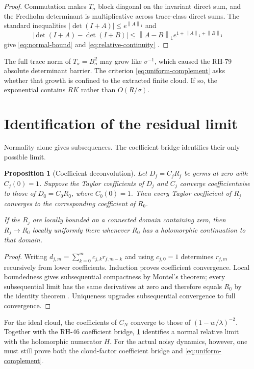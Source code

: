 \documentclass[11pt]{article}
\newtheorem{proposition}[theorem]{Proposition}
\theoremstyle{remark}
\newcommand{\norm}[1]{\left\lVert#1\right\rVert}
\begin{document}
\begin{proof}
Commutation makes $T_\sigma$ block diagonal on the invariant direct sum, and
the Fredholm determinant is multiplicative across trace-class direct sums.
The standard inequalities
$|\det(I+A)|\le e^{\norm A_1}$ and
\[
 |\det(I+A)-\det(I+B)|
 \le\norm{A-B}_1e^{1+\norm A_1+\norm B_1}
\]
give \eqref{eq:normal-bound} and \eqref{eq:relative-continuity}
\citep{Simon2005}.
\end{proof}

The full trace norm of $T_\sigma=B_\sigma^2$ may grow like
$\sigma^{-1}$, which caused the RH-79 absolute determinant barrier.  The
criterion \eqref{eq:uniform-complement} asks whether that growth is confined
to the extracted finite cloud.  If so, the exponential contains $RK$ rather
than $O(R/\sigma)$.

\section{Identification of the residual limit}

Normality alone gives subsequences.  The coefficient bridge identifies their
only possible limit.

\begin{proposition}[Coefficient deconvolution]
\label{prop:deconvolution}
Let $D_j=C_jR_j$ be germs at zero with $C_j(0)=1$.  Suppose the Taylor
coefficients of $D_j$ and $C_j$ converge coefficientwise to those of
$D_0=C_0R_0$, where $C_0(0)=1$.  Then every Taylor coefficient of $R_j$
converges to the corresponding coefficient of $R_0$.

If the $R_j$ are locally bounded on a connected domain containing zero, then
$R_j\to R_0$ locally uniformly there whenever $R_0$ has a holomorphic
continuation to that domain.
\end{proposition}

\begin{proof}
Writing $d_{j,m}=\sum_{k=0}^m c_{j,k}r_{j,m-k}$ and using $c_{j,0}=1$
determines $r_{j,m}$ recursively from lower coefficients.  Induction proves
coefficient convergence.  Local boundedness gives subsequential compactness
by Montel's theorem; every subsequential limit has the same derivatives at
zero and therefore equals $R_0$ by the identity theorem \citep{Conway1978}.
Uniqueness upgrades subsequential convergence to full convergence.
\end{proof}

For the ideal cloud, the coefficients of $C_N$ converge to those of
$(1-w/\lambda)^{-2}$.  Together with the RH-46 coefficient bridge,
\cref{prop:deconvolution} identifies a normal relative limit with the
holomorphic numerator $H$.  For the actual noisy dynamics, however, one must
still prove both the cloud-factor coefficient bridge and
\eqref{eq:uniform-complement}.
\end{document}
